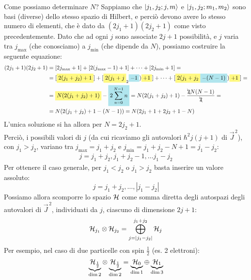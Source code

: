 \documentclass[../../FisicaTeorica.tex]{subfiles}
\begin{document}
Come possiamo determinare $N$? Sappiamo che $\Ket{j_1, j_2; j, m}$ e $\Ket{j_1, j_2; m_1, m_2}$ sono basi (diverse) dello stesso spazio di Hilbert, e perciò devono avere lo stesso numero di elementi, che è dato da $(2j_1 + 1)(2j_2 +1)$ come visto precedentemente. Dato che ad ogni $j$ sono associate $2j+1$ possibilità, e $j$ varia tra $j_{\max}$ (che conosciamo) a $j_{\min}$ (che dipende da $N$), possiamo costruire la seguente equazione:
\begin{align*}
(2j_1+1)(2j_2+1)&= [2j_{\max}+1] + [2(j_{\max}-1)+1] + \dots +[2j_{\min}+1]=\\
&=[\hlc{Yellow}{2(j_1+j_2)+1}]+[\hlc{Yellow}{2(j_1+j}_2\hlc{SkyBlue}{-1})\hlc{Yellow}{+1}]+ \dots + [\hlc{Yellow}{2(j_1+j_2}\hlc{SkyBlue}{-(N-1)})\hlc{Yellow}{+1}] =\\
&=\hlc{Yellow}{N(2(j_1+j_2)+1)}-\hlc{SkyBlue}{2 \sum_{n=0}^{N-1} n} = N(2(j_1 + j_2)+1) -\frac{\bcancel{2} N(N-1)}{\bcancel{2}} =\\
&=N(2(j_1+j_2)+ 1 - (N-1))=N(2j_1 + 1 + 2j_2 + 1 -N)
\end{align*}
L'unica soluzione si ha allora per $N=2j_2 +1$.\\
Perciò, i possibili valori di $j$ (da cui ricaviamo gli autovalori $\hbar^2 j(j+1)$ di $\vec{J}^{\,2}$), con $j_1 > j_2$, variano tra $j_{\max} = j_1 + j_2$ e $j_{\min} = j_1 + j_2 - N+1 = j_1-j_2$:
\begin{align*}
j =
j_1 + j_2, j_1 + j_2 -1, \dots j_1 - j_2
\end{align*}
Per ottenere il caso generale, per $j_1 < j_2$ o $j_1 > j_2$ basta inserire un valore assoluto:
\[
j = j_1 + j_2, \dots, |j_1-j_2|
\]
Possiamo allora scomporre lo spazio $\mathcal{H}$ come somma diretta degli autospazi degli autovalori di $\vec{J}^{\,2}$, individuati da $j$, ciascuno di dimensione $2j+1$:
\[
\mathcal{H}_{j_1}\otimes \mathcal{H}_{j_2} = \bigoplus_{j=|j_1-j_2|}^{j_1+j_2} \mathcal{H}_j
\]
Per esempio, nel caso di due particelle con spin $\frac{1}{2}$ (es. 2 elettroni):
\[
\underbrace{\mathcal{H}_{\frac{1}{2}}}_{\operatorname{dim} 2}\otimes \underbrace{\mathcal{H}_{\frac{1}{2}}}_{\operatorname{dim}2} = \underbrace{\mathcal{H}_0}_{\operatorname{dim} 1} \oplus \underbrace{\mathcal{H}_1}_{\operatorname{dim}3}
\]
\end{document}
